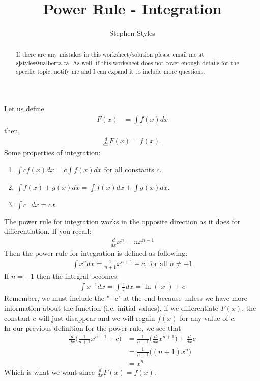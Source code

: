\documentclass[12pt]{article}
\title{Power Rule - Integration}
\author{Stephen Styles}
\theoremstyle{remark}
\begin{document}
\maketitle

\begin{abstract}
If there are any mistakes in this worksheet/solution please email me at sjstyles@ualberta.ca. As well, if this worksheet does not cover enough details for the specific topic, notify me and I can expand it to include more questions.
\end{abstract}

Let us define
\begin{align*}
F(x) &= \int f(x) dx
\end{align*}
then,
\begin{align*}
\frac{d}{dx} F(x) = f(x).
\end{align*}
Some properties of integration:
\begin{enumerate}
\item $\displaystyle{ \int c f(x)dx = c \int f(x) dx}$ for all constants $c$.

\item $\displaystyle{ \int f(x) + g(x) dx = \int f(x) dx + \int g(x) dx}$.

\item $\displaystyle{ \int c \text{ } dx = cx}$
\end{enumerate}
The power rule for integration works in the opposite direction as it does for differentiation. If you recall:
\begin{align*}
\frac{d}{d x} x^n = n x^{n-1}
\end{align*}
Then the power rule for integration is defined as following:
\begin{align*}
\int x^n dx = \frac{1}{n+1} x^{n+1} + c \text{,    for all } n \not = -1
\end{align*}
If $n= -1$ then the integral becomes:
\begin{align*}
\int x^{-1} dx = \int \frac{1}{x} dx = \ln( |x| ) + c
\end{align*}
\newpage
Remember, we must include the "+c" at the end because unless we have more information about the function (i.e. initial values), if we differentiate $F(x)$, the constant $c$ will just disappear and we will regain $f(x)$ for any value of $c$.\\

In our previous definition for the power rule, we see that
\begin{align*}
\frac{d}{dx} \bigg(\frac{1}{n+1} x^{n+1} + c \bigg) &= \frac{1}{n+1}\bigg(\frac{d}{dx} x^{n+1} \bigg) + \frac{d}{dx}c\\
&= \frac{1}{n+1} \big( (n+1) x^n\big)\\
&= x^n
\end{align*}
Which is what we want since $\displaystyle{ \frac{d}{dx} F(x) = f(x)}$.\\
\end{document}
